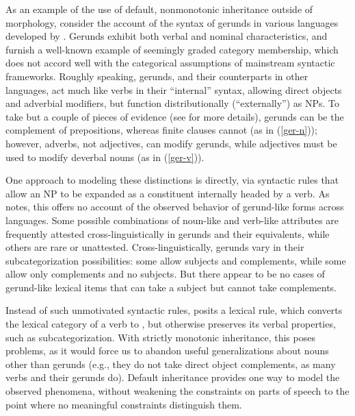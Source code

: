 \documentclass[output=paper
 	        ,biblatex
                ,babelshorthands
                ,newtxmath
                ,draftmode
                ,colorlinks, citecolor=brown
]{langscibook}
\begin{document}
As an example of the use of default, nonmonotonic inheritance outside of morphology, consider the account of the syntax of gerunds in various languages developed by \citet{Malouf2000a}.
Gerunds exhibit both verbal and nominal characteristics, and furnish a well-known example of seemingly graded category membership, which does not accord well with the categorical assumptions of mainstream syntactic frameworks.
Roughly speaking,  gerunds, and their counterparts in other languages, act much like verbs in their ``internal'' syntax, allowing direct objects and adverbial modifiers, but function distributionally (``externally'') as NPs.
To take but a couple of pieces of evidence (see \citealt[27--33]{Malouf2000a} for more details), 
gerunds can be the complement of prepositions, whereas finite clauses cannot (as in (\ref{ger-n})); however, adverbs, not adjectives, can modify gerunds, while adjectives must be used to modify deverbal nouns (as in (\ref{ger-v})).


\eal
\label{ger-n}
\zl
\eal
\label{ger-v}
\zl


One approach to modeling these distinctions is directly, via syntactic rules that allow an NP to be expanded as a constituent internally headed by a verb.
As \citeauthor{Malouf2000a} notes, this offers no account of the observed behavior of gerund-like forms across languages.
Some possible combinations of noun-like and verb-like attributes are frequently attested cross-linguistically in gerunds and their equivalents, while others are rare or unattested.
Cross-linguistically, gerunds vary in their subcategorization possibilities: some allow subjects and complements, while some allow only complements and no subjects.
But there appear to be no cases of gerund-like lexical items that can take a subject but cannot take complements.

Instead of such unmotivated syntactic rules, \citeauthor{Malouf2000a} posits a lexical rule, which converts the lexical category of a verb to , but otherwise preserves its verbal properties, such as subcategorization.
With strictly monotonic inheritance, this poses problems, as it would force us to abandon useful generalizations about nouns other than gerunds (e.g., they do not take direct object complements, as many verbs and their gerunds do).
Default inheritance provides one way to model the observed phenomena, without weakening the constraints on parts of speech to the point where no meaningful constraints distinguish them. 
\end{document}
